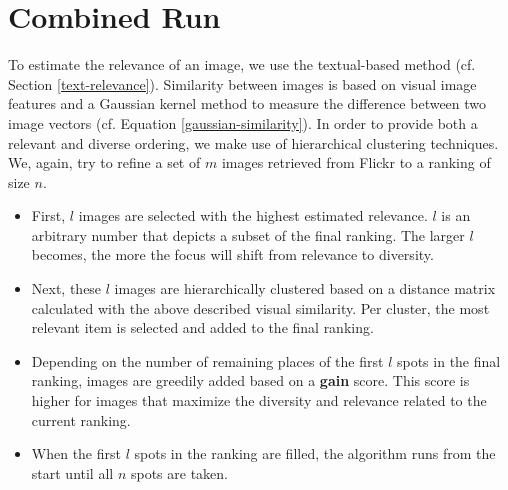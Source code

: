 \documentclass{acm_proc_article-me11_tweaked}
\begin{document}
\section{Combined Run}
To estimate the relevance of an image, we use the textual-based method (cf. Section \ref{text-relevance}).
Similarity between images is based on visual image features and a Gaussian kernel method to measure the difference between two image vectors (cf. Equation \ref{gaussian-similarity}).
In order to provide both a relevant and diverse ordering, we make use of hierarchical clustering techniques.
We, again, try to refine a set of $m$ images retrieved from Flickr to a ranking of size $n$.
\begin{itemize}[leftmargin=*]
 \item First, $l$ images are selected with the highest estimated relevance. $l$ is an arbitrary number that depicts a subset of the final ranking. 
The larger $l$ becomes, the more the focus will shift from relevance to diversity. 
 \item Next, these $l$ images are hierarchically clustered based on a distance matrix calculated with the above described visual similarity.
Per cluster, the most relevant item is selected and added to the final ranking.
 \item Depending on the number of remaining places of the first $l$ spots in the final ranking, images are greedily added based on a \textbf{gain} score.
 This score is higher for images that maximize the diversity and relevance related to the current ranking.
 \item When the first $l$ spots in the ranking are filled, the algorithm runs from the start until all $n$ spots are taken.
\end{itemize}
\end{document}
